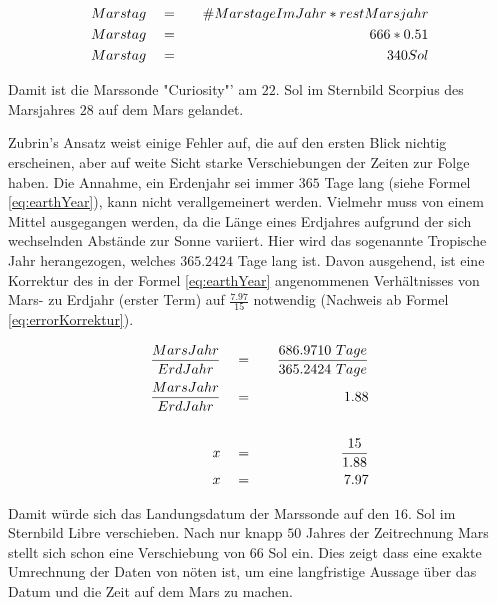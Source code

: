 \begin{eqnarray}
	Marstag \quad & = & \quad \#MarstageImJahr * restMarsjahr \\
	Marstag \quad & = & \quad 666 * 0.51 \notag\\
	Marstag \quad & = & \quad 340 Sol \notag
	\label{eq:MarsMonthSol}
\end{eqnarray}

Damit ist die Marssonde "Curiosity"' am $22.$ Sol im Sternbild Scorpius des 
Marsjahres $28$ auf dem Mars gelandet.

Zubrin's Ansatz weist einige Fehler auf, die auf den ersten Blick nichtig
erscheinen, aber auf weite Sicht starke Verschiebungen der Zeiten zur Folge
haben. Die Annahme, ein Erdenjahr sei immer $365$ Tage lang (siehe Formel
\ref{eq:earthYear}), kann nicht verallgemeinert werden. Vielmehr muss von einem
Mittel ausgegangen werden, da die Länge eines Erdjahres aufgrund der sich
wechselnden Abstände zur Sonne variiert. Hier wird das sogenannte Tropische Jahr
herangezogen, welches $365.2424$ Tage lang ist. Davon ausgehend, ist eine
Korrektur des in der Formel \ref{eq:earthYear} angenommenen Verhältnisses von
Mars- zu Erdjahr (erster Term) auf $\frac{7.97}{15}$ notwendig (Nachweis ab
Formel \ref{eq:errorKorrektur}).

\begin{eqnarray}
	\frac{MarsJahr}{ErdJahr} \quad & = & \quad \frac{686.9710 \ Tage}{365.2424 \ Tage}
	\\
	\label{eq:errorKorrektur}  
	\frac{MarsJahr}{ErdJahr} \quad & = & \quad 1.88 \notag\\
	\notag\\
	x \quad & = & \quad \frac{15}{1.88} \notag\\
	x \quad & = & \quad 7.97 \notag
\end{eqnarray}

Damit würde sich das Landungsdatum der Marssonde auf den $16.$ Sol im Sternbild
Libre verschieben. Nach nur knapp $50$ Jahres der Zeitrechnung Mars stellt sich
schon eine Verschiebung von $66$ Sol ein. Dies zeigt dass eine exakte Umrechnung
der Daten von nöten ist, um eine langfristige Aussage über das Datum und die
Zeit auf dem Mars zu machen.
